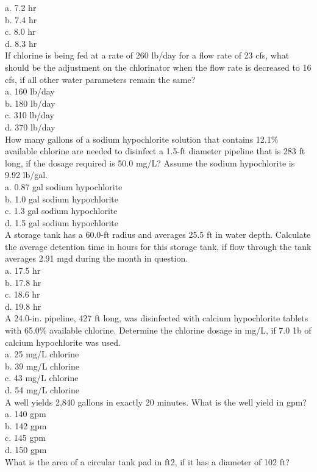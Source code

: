 a.	7.2 hr\\
b.	7.4 hr\\
c.	8.0 hr\\
d.	8.3 hr\\
If chlorine is being fed at a rate of 260 lb/day for a flow rate of 23 cfs, what should be the adjustment on the chlorinator when the flow rate is decreased to 16 cfs, if all other water parameters remain the same?\\
a.	160 lb/day\\
b.	180 lb/day\\
c.	310 lb/day\\
d.	370 lb/day\\
How many gallons of a sodium hypochlorite solution that contains 12.1\% available chlorine are needed to disinfect a 1.5-ft diameter pipeline that is 283 ft long, if the dosage required is 50.0 mg/L? Assume the sodium hypochlorite is 9.92 lb/gal.\\
a.	0.87 gal sodium hypochlorite\\
b.	1.0 gal sodium hypochlorite\\
c.	1.3 gal sodium hypochlorite\\
d.	1.5 gal sodium hypochlorite\\
A storage tank has a 60.0-ft radius and averages 25.5 ft in water depth. Calculate the average detention time in hours for this storage tank, if flow through the tank averages 2.91 mgd during the month in question.\\
a.	17.5 hr\\
b.	17.8 hr\\
c.	18.6 hr\\
d.	19.8 hr\\
A 24.0-in. pipeline, 427 ft long, was disinfected with calcium hypochlorite tablets with 65.0\% available chlorine. Determine the chlorine dosage in mg/L, if 7.0 1b of calcium hypochlorite was used.\\
a.	25 mg/L chlorine\\
b.	39 mg/L chlorine\\
c.	43 mg/L chlorine\\
d.	54 mg/L chlorine\\
A well yields 2,840 gallons in exactly 20 minutes. What is the well yield in gpm?\\
a.	140 gpm\\
b.	142 gpm\\
c.	145 gpm\\
d.	150 gpm\\
What is the area of a circular tank pad in ft2, if it has a diameter of 102 ft?\\
